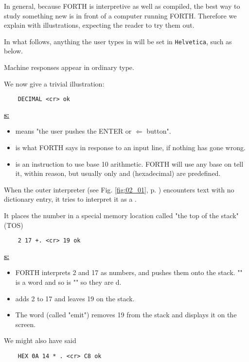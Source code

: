 In general, because FORTH is interpretive as well as compiled, the best way to study something new is in front of a computer running FORTH. Therefore we explain with illustrations, expecting the reader to try them out.

In what follows, anything the user types in will be set in \lstinline$Helvetica$, such as  below.

Machine responses appear in ordinary type.

We now give a trivial illustration:

\begin{lstlisting}
    DECIMAL <cr> ok
\end{lstlisting}

\Note \textbf{\underline{s:}}
\begin{itemize}
  \item {} means "the user pushes the ENTER or $\Leftarrow$ button".
  \item {} is what FORTH says in response to an input line, if nothing has gone wrong.
  \item {} is an instruction to use base 10 arithmetic. FORTH will use any base on tell it, within reason, but usually only  and  (hexadecimal) are predefined.
\end{itemize}

When the outer interpreter (see Fig. \ref{fig:02_01}, p. \pageref{fig:02_01}) encounters text with no dictionary entry, it tries to interpret it as a .

It places the number in a special memory location called "the top of the stack" (TOS)
\begin{lstlisting}
    2 17 +. <cr> 19 ok
\end{lstlisting}

\Note \textbf{\underline{s:}}
\begin{itemize}
  \item FORTH interprets 2 and 17 as numbers, and pushes them onto the stack. "\bc{+}" is a word and so is "" so they are d.
  \item \bc{+} adds 2 to 17 and leaves 19 on the stack.
  \item The word  (called "emit") removes 19 from the stack and displays it on the screen.
\end{itemize}

We might also have said

\begin{lstlisting}
    HEX 0A 14 * . <cr> C8 ok
\end{lstlisting}

